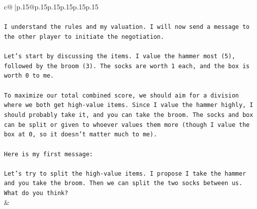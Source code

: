 \documentclass{article}
\begin{document}
{\begin{supertabular}{c@{$\;$}|p{.15\linewidth}@{}p{.15\linewidth}p{.15\linewidth}p{.15\linewidth}p{.15\linewidth}p{.15\linewidth}}
{{{\\ 
\\ 
\texttt{I understand the rules and my valuation. I will now send a message to the other player to initiate the negotiation.} \\
\\ 
\texttt{Let's start by discussing the items. I value the hammer most (5), followed by the broom (3). The socks are worth 1 each, and the box is worth 0 to me.} \\
\\ 
\texttt{To maximize our total combined score, we should aim for a division where we both get high{-}value items. Since I value the hammer highly, I should probably take it, and you can take the broom. The socks and box can be split or given to whoever values them more (though I value the box at 0, so it doesn't matter much to me).} \\
\\ 
\texttt{Here is my first message:} \\
\\ 
\texttt{Let's try to split the high{-}value items. I propose I take the hammer and you take the broom. Then we can split the two socks between us. What do you think?} \\
            }
        }
    }
    & \\ \\


\end{supertabular}}
\end{document}
